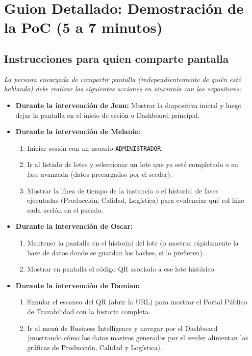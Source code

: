\documentclass[12pt,a4paper]{article}
\begin{document}
\section*{Guion Detallado: Demostración de la PoC (5 a 7 minutos)}

\subsection*{Instrucciones para quien comparte pantalla}
\textit{La persona encargada de compartir pantalla (independientemente de quién esté hablando) debe realizar las siguientes acciones en sincronía con los expositores:}

\begin{itemize}
    \item \textbf{Durante la intervención de Jean:} Mostrar la diapositiva inicial y luego dejar la pantalla en el inicio de sesión o Dashboard principal.
    \item \textbf{Durante la intervención de Melanie:} 
    \begin{enumerate}
        \item Iniciar sesión con un usuario \texttt{ADMINISTRADOR}.
        \item Ir al listado de lotes y seleccionar un lote que ya esté completado o en fase avanzada (datos precargados por el seeder).
        \item Mostrar la línea de tiempo de la instancia o el historial de fases ejecutadas (Producción, Calidad, Logística) para evidenciar qué rol hizo cada acción en el pasado.
    \end{enumerate}
    \item \textbf{Durante la intervención de Oscar:} 
    \begin{enumerate}
        \item Mantener la pantalla en el historial del lote (o mostrar rápidamente la base de datos donde se guardan los hashes, si lo prefieren).
        \item Mostrar en pantalla el código QR asociado a ese lote histórico.
    \end{enumerate}
    \item \textbf{Durante la intervención de Damian:} 
    \begin{enumerate}
        \item Simular el escaneo del QR (abrir la URL) para mostrar el Portal Público de Trazabilidad con la historia completa.
        \item Ir al menú de Business Intelligence y navegar por el Dashboard (mostrando cómo los datos masivos generados por el seeder alimentan las gráficas de Producción, Calidad y Logística).
    \end{enumerate}
\end{itemize}
\end{document}
